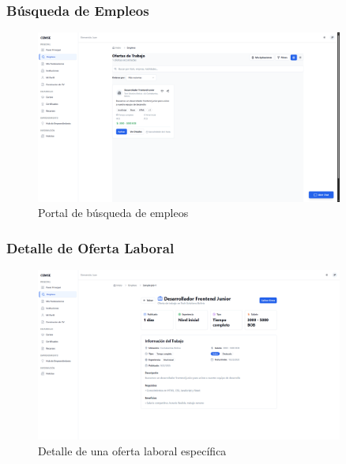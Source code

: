 \documentclass[12pt,a4paper]{article}
\begin{document}
\begin{enumerate}
\subsubsection{Búsqueda de Empleos}
\begin{figure}[H]
    \centering
    \includegraphics[width=0.9\textwidth]{screenshots/youth/jobs-search.png}
    \caption{Portal de búsqueda de empleos}
    \label{fig:youth-jobs}
\end{figure}

\subsubsection{Detalle de Oferta Laboral}
\begin{figure}[H]
    \centering
    \includegraphics[width=0.9\textwidth]{screenshots/youth/job-detail.png}
    \caption{Detalle de una oferta laboral específica}
    \label{fig:youth-job-detail}
\end{figure}


\end{enumerate}
\end{document}
